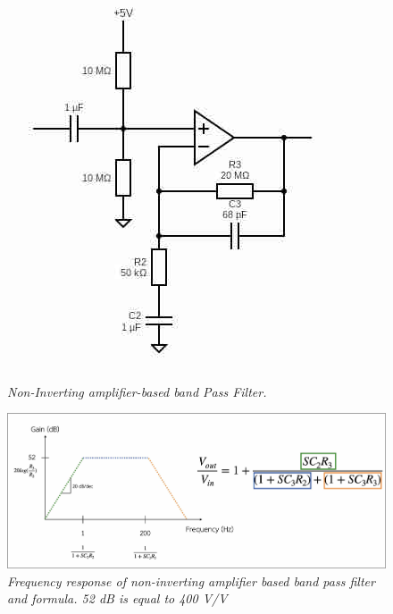 \begin{figure}[H]
  \centering
  \caption[Non-Inverting amplifier-based band Pass Filter.]{\emph{Non-Inverting amplifier-based band Pass Filter.}}\label{fig:analog_circuit_}
  \includegraphics[scale = 0.7]{figures/analog_circuit_1.jpg}
\end{figure}

\begin{figure}[H]
  \centering
  \caption[Frequency response of non-inverting amplifier based band pass filter and formula.]{\emph{Frequency response of non-inverting amplifier based band pass filter and formula. 52 dB is equal to 400 V/V}}\label{fig:analog_circuit_cal}
  \includegraphics[scale = 0.15]{figures/analog_circuit_2.jpg}
\end{figure}

